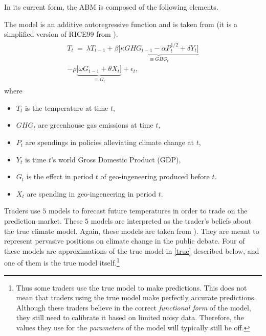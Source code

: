 \documentclass{sig-alternate}
\begin{document}
	In its current form, the ABM is composed of the following elements.
	
	\begin{description}
		\setlength\itemsep{0em}
		\item [A simple ``true" model $F$ of world temperatures.] The model is an additive autoregressive function and is taken  from \cite{Sumner2008b} (it is a simplified version of  RICE99 from \cite{Nordhaus}).
		\begin{align}
		\label{true}
		\begin{split}
				T_t ~ =~  \lambda T_{t-1} + \beta \underbrace{\big[ \kappa GHG_{t-1} - \alpha P_t^{1/2} + \delta Y_t  \big]}_{\equiv GHG_t} \\
				- \rho \underbrace{\big[ \omega G_{t-1} + \theta X_{t} \big]}_{\equiv G_t} +  \epsilon_t, 
		\end{split}
		\end{align}
		where
		\begin{itemize}
			\item $T_t$ is the temperature at time $t$,
			\item $GHG_t$ are greenhouse gas emissions at time $t$,
			\item $P_t$ are spendings in policies alleviating climate change at $t$,
			\item $Y_t$ is time $t$'s world Gross Domestic Product (GDP),
			\item $G_{t}$ is the effect in period $t$ of geo-ingeneering produced before $t$. 
			\item $X_t$ are spending in geo-ingeneering in period  $t$.
		\end{itemize}
		
		
		\item[ Beliefs.]  Traders use $5$ models to  forecast future temperatures in order to trade on the prediction market. These $5$ models are interpreted as the trader's beliefs about the true climate model.  Again, these models are taken from \cite{Sumner2008b}). They are meant to represent pervasive positions on climate change in the public debate. Four of these models are approximations of the true model in \eqref{true} described below, and one of them is the true model itself.\footnote{Thus some traders use the true model to make predictions. This does not mean that traders using the true model make perfectly accurate predictions. Although these traders believe in the correct \emph{functional form} of the model, they still need to calibrate it based on limited noisy data. Therefore, the values they use for  the \emph{parameters} of the model will typically still be off.} 
		

\end{description}
\end{document}
